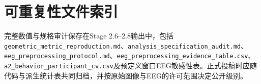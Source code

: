 \documentclass[11pt,a4paper]{ctexart}
\begin{document}
\section{可重复性文件索引}

完整数值与规格审计保存在Stage 2.6--2.8输出中，包括\texttt{geometric\_metric\_reproduction.md}、\texttt{analysis\_specification\_audit.md}、\texttt{eeg\_preprocessing\_protocol.md}、\texttt{eeg\_preprocessing\_evidence\_table.csv}、\texttt{a2\_behavior\_participant\_cv.csv}及预定义窗口EEG敏感性表。正式投稿时应随代码与派生统计表共同归档，并按原始图像与EEG的许可范围决定公开级别。
\end{document}
